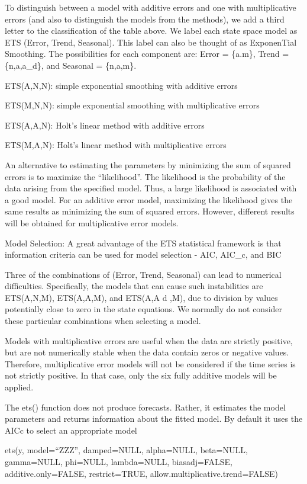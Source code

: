 \documentclass[]{book}
\begin{document}
To distinguish between a model with additive errors and one with
multiplicative errors (and also to distinguish the models from the
methods), we add a third letter to the classification of the table
above. We label each state space model as ETS (Error, Trend, Seasonal).
This label can also be thought of as ExponenTial Smoothing. The
possibilities for each component are: Error = \{a.m\}, Trend =
\{n,a,a\_d\}, and Seasonal = \{n,a,m\}.

ETS(A,N,N): simple exponential smoothing with additive errors

ETS(M,N,N): simple exponential smoothing with multiplicative errors

ETS(A,A,N): Holt's linear method with additive errors

ETS(M,A,N): Holt's linear method with multiplicative errors

An alternative to estimating the parameters by minimizing the sum of
squared errors is to maximize the ``likelihood''. The likelihood is the
probability of the data arising from the specified model. Thus, a large
likelihood is associated with a good model. For an additive error model,
maximizing the likelihood gives the same results as minimizing the sum
of squared errors. However, different results will be obtained for
multiplicative error models.

Model Selection: A great advantage of the ETS statistical framework is
that information criteria can be used for model selection - AIC, AIC\_c,
and BIC

Three of the combinations of (Error, Trend, Seasonal) can lead to
numerical difficulties. Specifically, the models that can cause such
instabilities are ETS(A,N,M), ETS(A,A,M), and ETS(A,A d ,M), due to
division by values potentially close to zero in the state equations. We
normally do not consider these particular combinations when selecting a
model.

Models with multiplicative errors are useful when the data are strictly
positive, but are not numerically stable when the data contain zeros or
negative values. Therefore, multiplicative error models will not be
considered if the time series is not strictly positive. In that case,
only the six fully additive models will be applied.

The ets() function does not produce forecasts. Rather, it estimates the
model parameters and returns information about the fitted model. By
default it uses the AICc to select an appropriate model

ets(y, model=``ZZZ'', damped=NULL, alpha=NULL, beta=NULL, gamma=NULL,
phi=NULL, lambda=NULL, biasadj=FALSE, additive.only=FALSE,
restrict=TRUE, allow.multiplicative.trend=FALSE)
\end{document}
